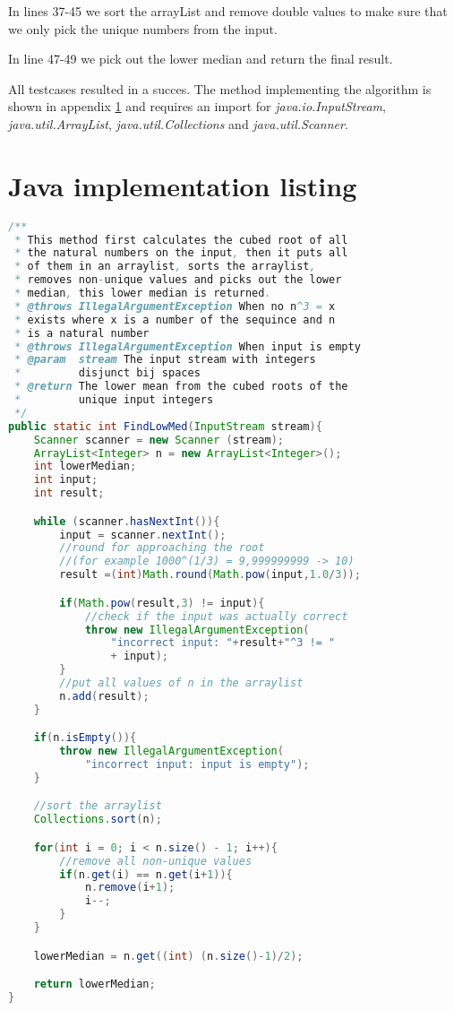 \documentclass[12pt]{article}
\begin{document}
In lines 37-45 we sort the arrayList and remove double values to make sure that we only pick the unique numbers from the input.

In line 47-49 we pick out the lower median and return the final result.

All testcases resulted in a succes. The method implementing the algorithm is shown in appendix \ref{codelisting} and requires an import for \textsl{java.io.InputStream}, \textsl{java.util.ArrayList}, \textsl{java.util.Collections} and \textsl{java.util.Scanner}.

\appendix

\section{Java implementation listing}
\label{codelisting}
\begin{lstlisting}[language=java]
/**
 * This method first calculates the cubed root of all 
 * the natural numbers on the input, then it puts all 
 * of them in an arraylist, sorts the arraylist, 
 * removes non-unique values and picks out the lower 
 * median, this lower median is returned.
 * @throws IllegalArgumentException When no n^3 = x 
 * exists where x is a number of the sequince and n 
 * is a natural number
 * @throws IllegalArgumentException When input is empty
 * @param  stream The input stream with integers
 *         disjunct bij spaces
 * @return The lower mean from the cubed roots of the 
 *         unique input integers
 */
public static int FindLowMed(InputStream stream){
    Scanner scanner = new Scanner (stream);
    ArrayList<Integer> n = new ArrayList<Integer>();
    int lowerMedian;
    int input;
    int result;

    while (scanner.hasNextInt()){
        input = scanner.nextInt();
        //round for approaching the root 
        //(for example 1000^(1/3) = 9,999999999 -> 10)
        result =(int)Math.round(Math.pow(input,1.0/3));

        if(Math.pow(result,3) != input){
            //check if the input was actually correct
            throw new IllegalArgumentException(
                "incorrect input: "+result+"^3 != "
                + input);
        }
        //put all values of n in the arraylist
        n.add(result);
    }

    if(n.isEmpty()){
        throw new IllegalArgumentException(
            "incorrect input: input is empty");
    }

    //sort the arraylist
    Collections.sort(n);

    for(int i = 0; i < n.size() - 1; i++){
        //remove all non-unique values
        if(n.get(i) == n.get(i+1)){
            n.remove(i+1);
            i--;
        }
    }

    lowerMedian = n.get((int) (n.size()-1)/2);

    return lowerMedian;
}
\end{lstlisting}
\end{document}
